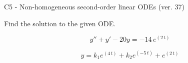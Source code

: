 \begin{exercise}
  \begin{exerciseTitle}C5 - Non-homogeneous second-order linear ODEs (ver. 37)\end{exerciseTitle}
  \begin{exerciseStatement}
    
Find the solution to the given ODE.

    
\[y''+y'-20y = -14 \, e^{\left(2 \, t\right)}\]

  \end{exerciseStatement}
  \begin{exerciseAnswer}
    
\[y= k_{1} e^{\left(4 \, t\right)} + k_{2} e^{\left(-5 \, t\right)} + e^{\left(2 \, t\right)}\]

  \end{exerciseAnswer}
\end{exercise}